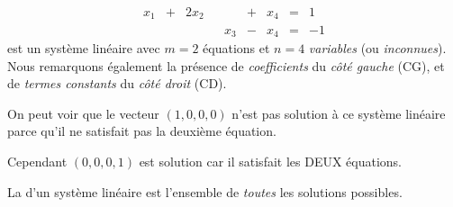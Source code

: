 \begin{myexample}
\begin{equation} \label{E11:1}
\begin{matrix}
x_1 & + & 2x_2 &&     & + & x_4 & = & 1\\
    &   &      && x_3 & - & x_4 & = & -1
\end{matrix} 
\end{equation}
est un système linéaire avec $m=2$ équations et $n=4$ \emph{variables} (ou \emph{inconnues}).  Nous remarquons également la présence de \emph{coefficients} du \emph{côté gauche} (CG), et de \emph{termes constants} du \emph{côté droit} (CD).

On peut voir que le vecteur $(1,0,0,0)$ n'est pas solution à ce système linéaire parce qu'il
ne satisfait pas la deuxi\`eme équation.

Cependant $(0,0,0,1)$ est solution car il
satisfait les DEUX équations.
\end{myexample}


\begin{definition}
La  d'un système linéaire est l'ensemble de \emph{toutes} les
solutions possibles.
\end{definition}

